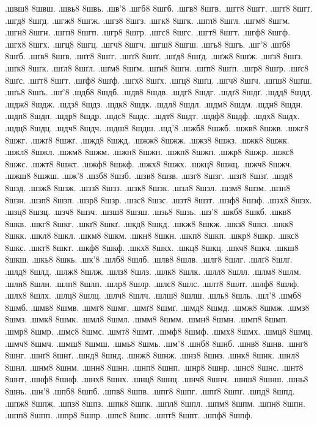 {.швш8
8швш.
.швь8
8швь.
.шв'8
.шгб8
8шгб.
.шгв8
8шгв.
.шгг8
8шгг.
.шгґ8
8шгґ.
.шгд8
8шгд.
.шгж8
8шгж.
.шгз8
8шгз.
.шгк8
8шгк.
.шгл8
8шгл.
.шгм8
8шгм.
.шгн8
8шгн.
.шгп8
8шгп.
.шгр8
8шгр.
.шгс8
8шгс.
.шгт8
8шгт.
.шгф8
8шгф.
.шгх8
8шгх.
.шгц8
8шгц.
.шгч8
8шгч.
.шгш8
8шгш.
.шгь8
8шгь.
.шг'8
.шґб8
8шґб.
.шґв8
8шґв.
.шґг8
8шґг.
.шґґ8
8шґґ.
.шґд8
8шґд.
.шґж8
8шґж.
.шґз8
8шґз.
.шґк8
8шґк.
.шґл8
8шґл.
.шґм8
8шґм.
.шґн8
8шґн.
.шґп8
8шґп.
.шґр8
8шґр.
.шґс8
8шґс.
.шґт8
8шґт.
.шґф8
8шґф.
.шґх8
8шґх.
.шґц8
8шґц.
.шґч8
8шґч.
.шґш8
8шґш.
.шґь8
8шґь.
.шґ'8
.шдб8
8шдб.
.шдв8
8шдв.
.шдг8
8шдг.
.шдґ8
8шдґ.
.шдд8
8шдд.
.шдж8
8шдж.
.шдз8
8шдз.
.шдк8
8шдк.
.шдл8
8шдл.
.шдм8
8шдм.
.шдн8
8шдн.
.шдп8
8шдп.
.шдр8
8шдр.
.шдс8
8шдс.
.шдт8
8шдт.
.шдф8
8шдф.
.шдх8
8шдх.
.шдц8
8шдц.
.шдч8
8шдч.
.шдш8
8шдш.
.шд'8
.шжб8
8шжб.
.шжв8
8шжв.
.шжг8
8шжг.
.шжґ8
8шжґ.
.шжд8
8шжд.
.шжж8
8шжж.
.шжз8
8шжз.
.шжк8
8шжк.
.шжл8
8шжл.
.шжм8
8шжм.
.шжн8
8шжн.
.шжп8
8шжп.
.шжр8
8шжр.
.шжс8
8шжс.
.шжт8
8шжт.
.шжф8
8шжф.
.шжх8
8шжх.
.шжц8
8шжц.
.шжч8
8шжч.
.шжш8
8шжш.
.шж'8
.шзб8
8шзб.
.шзв8
8шзв.
.шзг8
8шзг.
.шзґ8
8шзґ.
.шзд8
8шзд.
.шзж8
8шзж.
.шзз8
8шзз.
.шзк8
8шзк.
.шзл8
8шзл.
.шзм8
8шзм.
.шзн8
8шзн.
.шзп8
8шзп.
.шзр8
8шзр.
.шзс8
8шзс.
.шзт8
8шзт.
.шзф8
8шзф.
.шзх8
8шзх.
.шзц8
8шзц.
.шзч8
8шзч.
.шзш8
8шзш.
.шзь8
8шзь.
.шз'8
.шкб8
8шкб.
.шкв8
8шкв.
.шкг8
8шкг.
.шкґ8
8шкґ.
.шкд8
8шкд.
.шкж8
8шкж.
.шкз8
8шкз.
.шкк8
8шкк.
.шкл8
8шкл.
.шкм8
8шкм.
.шкн8
8шкн.
.шкп8
8шкп.
.шкр8
8шкр.
.шкс8
8шкс.
.шкт8
8шкт.
.шкф8
8шкф.
.шкх8
8шкх.
.шкц8
8шкц.
.шкч8
8шкч.
.шкш8
8шкш.
.шкь8
8шкь.
.шк'8
.шлб8
8шлб.
.шлв8
8шлв.
.шлг8
8шлг.
.шлґ8
8шлґ.
.шлд8
8шлд.
.шлж8
8шлж.
.шлз8
8шлз.
.шлк8
8шлк.
.шлл8
8шлл.
.шлм8
8шлм.
.шлн8
8шлн.
.шлп8
8шлп.
.шлр8
8шлр.
.шлс8
8шлс.
.шлт8
8шлт.
.шлф8
8шлф.
.шлх8
8шлх.
.шлц8
8шлц.
.шлч8
8шлч.
.шлш8
8шлш.
.шль8
8шль.
.шл'8
.шмб8
8шмб.
.шмв8
8шмв.
.шмг8
8шмг.
.шмґ8
8шмґ.
.шмд8
8шмд.
.шмж8
8шмж.
.шмз8
8шмз.
.шмк8
8шмк.
.шмл8
8шмл.
.шмм8
8шмм.
.шмн8
8шмн.
.шмп8
8шмп.
.шмр8
8шмр.
.шмс8
8шмс.
.шмт8
8шмт.
.шмф8
8шмф.
.шмх8
8шмх.
.шмц8
8шмц.
.шмч8
8шмч.
.шмш8
8шмш.
.шмь8
8шмь.
.шм'8
.шнб8
8шнб.
.шнв8
8шнв.
.шнг8
8шнг.
.шнґ8
8шнґ.
.шнд8
8шнд.
.шнж8
8шнж.
.шнз8
8шнз.
.шнк8
8шнк.
.шнл8
8шнл.
.шнм8
8шнм.
.шнн8
8шнн.
.шнп8
8шнп.
.шнр8
8шнр.
.шнс8
8шнс.
.шнт8
8шнт.
.шнф8
8шнф.
.шнх8
8шнх.
.шнц8
8шнц.
.шнч8
8шнч.
.шнш8
8шнш.
.шнь8
8шнь.
.шн'8
.шпб8
8шпб.
.шпв8
8шпв.
.шпг8
8шпг.
.шпґ8
8шпґ.
.шпд8
8шпд.
.шпж8
8шпж.
.шпз8
8шпз.
.шпк8
8шпк.
.шпл8
8шпл.
.шпм8
8шпм.
.шпн8
8шпн.
.шпп8
8шпп.
.шпр8
8шпр.
.шпс8
8шпс.
.шпт8
8шпт.
.шпф8
8шпф.
}
